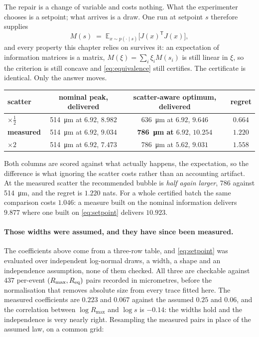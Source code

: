 \documentclass[10pt]{article}
\begin{document}
The repair is a change of variable and costs nothing. What the experimenter chooses is a
setpoint; what arrives is a draw. One run at setpoint $s$ therefore supplies
%
\begin{equation}
M(s) \;=\; \mathbb{E}_{x\sim p(\cdot\mid s)}\big[J(x)^{\mathsf T}J(x)\big],
\label{eq:setpoint}
\end{equation}
%
and every property this chapter relies on survives it: an expectation of information matrices is
a matrix, $M(\xi)=\sum_i \xi_i M(s_i)$ is still linear in $\xi$, so the criterion is still
concave and \eqref{eq:equivalence} still certifies. The certificate is identical. Only the
answer moves.

\begin{center}
\begin{tabular}{lccc}
\toprule
scatter & nominal peak, delivered & scatter-aware optimum, delivered & regret \\
\midrule
$\times\tfrac12$ & \SI{514}{\micro\metre} at $6.92$, $8.982$ & \SI{636}{\micro\metre} at $6.92$, $9.646$ & $0.664$ \\
\textbf{measured} & \SI{514}{\micro\metre} at $6.92$, $9.034$ & \textbf{\SI{786}{\micro\metre} at $6.92$}, $10.254$ & $\mathbf{1.220}$ \\
$\times 2$ & \SI{514}{\micro\metre} at $6.92$, $7.473$ & \SI{786}{\micro\metre} at $5.62$, $9.031$ & $1.558$ \\
\bottomrule
\end{tabular}
\end{center}

\noindent Both columns are scored against what actually happens, the expectation, so the
difference is what ignoring the scatter costs rather than an accounting artifact. At the measured
scatter the recommended bubble is \emph{half again larger}, \SI{786}{} against
\SI{514}{\micro\metre}, and the regret is $1.220$ nats. For a whole certified batch the same
comparison costs $1.046$: a measure built on the nominal information delivers $9.877$ where one
built on \eqref{eq:setpoint} delivers $10.923$.

\paragraph{Those widths were assumed, and they have since been measured.} The coefficients above
come from a three-row table, and \eqref{eq:setpoint} was evaluated over independent log-normal
draws, a width, a shape and an independence assumption, none of them checked. All three are
checkable against $437$ per-event $(R_{\max}, R_{\rm eq})$ pairs recorded in micrometres, before
the normalisation that removes absolute size from every trace fitted here. The measured
coefficients are $0.223$ and $0.067$ against the assumed $0.25$ and $0.06$, and the correlation
between $\log R_{\max}$ and $\log s$ is $-0.14$: the widths hold and the independence is very
nearly right. Resampling the measured pairs in place of the assumed law, on a common grid:
\end{document}
